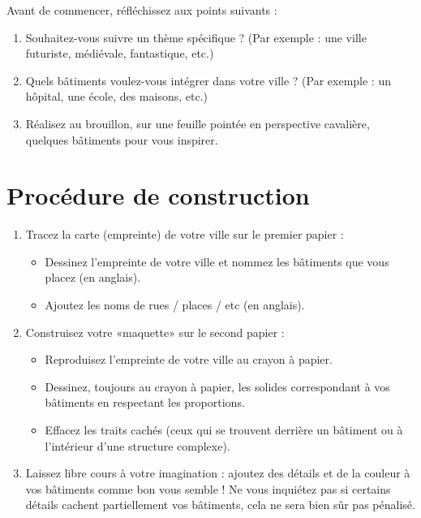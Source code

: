 Avant de commencer, réfléchissez aux points suivants :
\begin{enumerate}
    \item Souhaitez-vous suivre un thème spécifique ? 
    (Par exemple : une ville futuriste, médiévale, fantastique, etc.)
    \item Quels bâtiments voulez-vous intégrer dans votre ville ? 
    (Par exemple : un hôpital, une école, des maisons, etc.)
    \item Réalisez au brouillon, sur une feuille pointée en perspective cavalière, quelques bâtiments pour vous inspirer.
\end{enumerate}

\vspace{-0.5cm}
\section*{Procédure de construction}
\vspace{-0.75cm}

\begin{enumerate}
    \item Tracez la carte (empreinte) de votre ville sur le premier papier :
    
    \begin{itemize}
        \item Dessinez l'empreinte de votre ville et nommez les bâtiments que vous placez (en anglais).
        \item Ajoutez les noms de rues / places / etc (en anglais).
    \end{itemize}
    \item Construisez votre «maquette» sur le second papier :
    
    \begin{itemize}
        \item Reproduisez l'empreinte de votre ville au crayon à papier.
        \item Dessinez, toujours au crayon à papier, les solides correspondant à vos bâtiments en respectant les proportions.
        \item Effacez les traits cachés (ceux qui se trouvent derrière un bâtiment ou à l'intérieur d'une structure complexe).
    \end{itemize}
    \item Laissez libre cours à votre imagination : ajoutez des détails et de la couleur à vos bâtiments comme bon vous semble ! 
    Ne vous inquiétez pas si certains détails cachent partiellement vos bâtiments, cela ne sera bien sûr pas pénalisé.
\end{enumerate}
